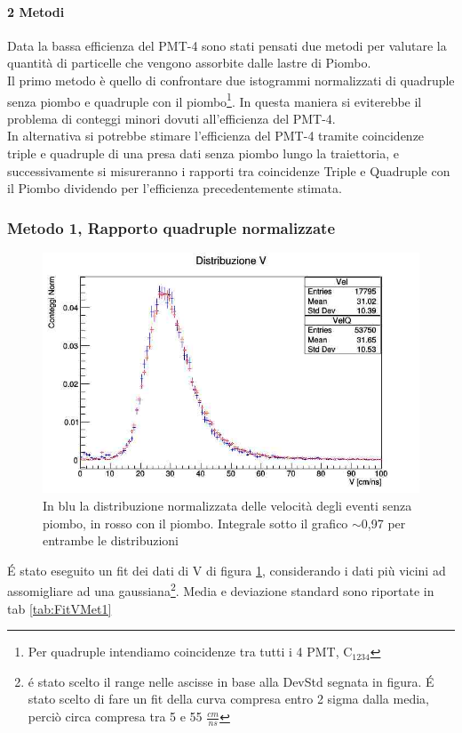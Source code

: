 \documentclass[a4paper]{article}
\begin{document}
\paragraph{2 Metodi}
Data la bassa efficienza del PMT-4 sono stati pensati due metodi per valutare la quantità di particelle che vengono assorbite dalle lastre di Piombo.\\
Il primo metodo è quello di confrontare due istogrammi normalizzati di quadruple senza piombo e quadruple con il piombo\footnote{Per quadruple intendiamo coincidenze tra tutti i 4 PMT, C$_{1234}$}. In questa maniera si eviterebbe il problema di conteggi minori dovuti all'efficienza del PMT-4.\\
In alternativa si potrebbe stimare l'efficienza del PMT-4 tramite coincidenze triple e quadruple di una presa dati senza piombo lungo la traiettoria, e successivamente si misureranno i rapporti tra coincidenze Triple e Quadruple con il Piombo dividendo per l'efficienza precedentemente stimata.

\subsubsection*{Metodo 1, Rapporto quadruple normalizzate}

\begin{figure}[H]
\centering
\includegraphics[scale=0.3]{./immagini/TimeOfFlight/VNormForeQuadruple.jpg}
\caption{In blu la distribuzione normalizzata delle velocità degli eventi senza piombo, in rosso con il piombo. Integrale sotto il grafico $\sim$0,97 per entrambe le distribuzioni}
\label{fig:VNormFore}
\end{figure}

\'E stato eseguito un fit dei dati di V di figura \ref{fig:VNormFore}, considerando i dati più vicini ad assomigliare ad una gaussiana\footnote{é stato scelto il range nelle ascisse in base alla DevStd segnata in figura. \'E stato scelto di fare un fit della curva compresa entro 2 sigma dalla media, perciò circa compresa tra 5 e 55 $\frac{cm}{ns}$}. Media e deviazione standard sono riportate in tab \ref{tab:FitVMet1}
\end{document}
